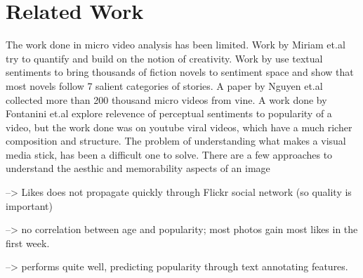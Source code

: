 \section{ Related Work}
The work done in micro video analysis has been limited. Work by Miriam et.al \cite{redi20146} try to quantify and build on the notion of creativity. Work by \cite{reagan2016emotional} use textual sentiments to bring thousands of fiction novels to sentiment space and show that most novels follow 7 salient categories of stories. 
A paper by Nguyen et.al \cite{nguyen2016open} collected more than 200 thousand micro videos from vine. 
A work done by Fontanini et.al \cite{fontanini2016web} explore relevence of perceptual sentiments to popularity of a video, but the work done was on youtube viral videos, which have a much richer composition and structure. 
The problem of understanding what makes a visual media stick, has been a difficult one to solve. There are a few approaches to understand the aesthic and memorability aspects of an image \cite{Isola2011} \cite{datta2008algorithmic} \cite{goodSelfie}


\cite{Cha2009Flickr} --> Likes does not propagate quickly through Flickr social network (so quality is important)

\cite{Valafar2009} --> no correlation between age and popularity; most photos gain most likes in the first week. 

\cite{Yamasaki:2014} --> performs quite well, predicting popularity through text annotating  features.